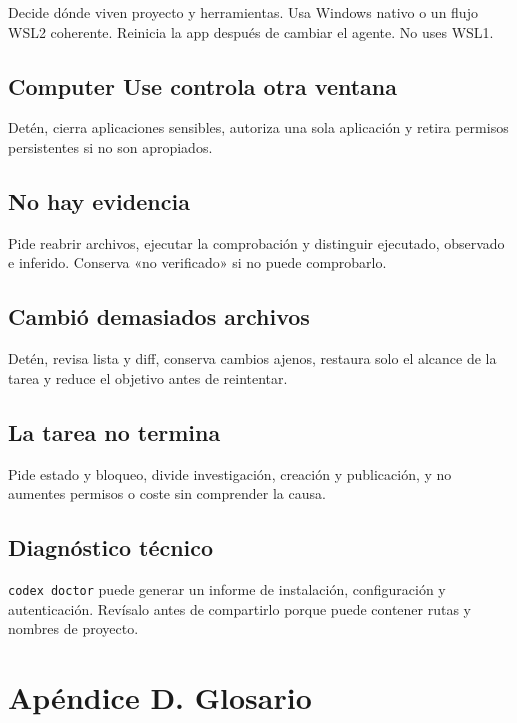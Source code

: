 \documentclass[10pt,a4paper,openany]{book}
\begin{document}
Decide dónde viven proyecto y herramientas. Usa Windows nativo o un
flujo WSL2 coherente. Reinicia la app después de cambiar el agente. No
uses WSL1.

\section{Computer Use controla otra
ventana}\label{computer-use-controla-otra-ventana}

Detén, cierra aplicaciones sensibles, autoriza una sola aplicación y
retira permisos persistentes si no son apropiados.

\section{No hay evidencia}\label{no-hay-evidencia}

Pide reabrir archivos, ejecutar la comprobación y distinguir ejecutado,
observado e inferido. Conserva «no verificado» si no puede comprobarlo.

\section{Cambió demasiados
archivos}\label{cambiuxf3-demasiados-archivos}

Detén, revisa lista y diff, conserva cambios ajenos, restaura solo el
alcance de la tarea y reduce el objetivo antes de reintentar.

\section{La tarea no termina}\label{la-tarea-no-termina}

Pide estado y bloqueo, divide investigación, creación y publicación, y
no aumentes permisos o coste sin comprender la causa.

\section{Diagnóstico técnico}\label{diagnuxf3stico-tuxe9cnico}

\texttt{codex\ doctor} puede generar un informe de instalación,
configuración y autenticación. Revísalo antes de compartirlo porque
puede contener rutas y nombres de proyecto.

\chapter{Apéndice D. Glosario}\label{apuxe9ndice-d.-glosario}
\end{document}
